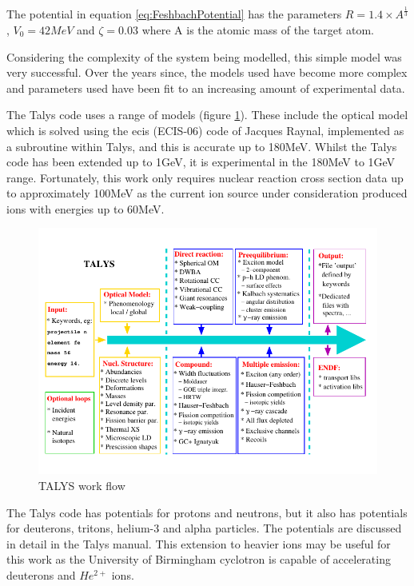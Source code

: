 The potential in equation \ref{eq:FeshbachPotential} has the parameters $R = 1.4 \times A^{\frac{1}{3}}$, $V_0 = 42MeV$ and $\zeta = 0.03$ where A is the atomic mass of the target atom.

Considering the complexity of the system being modelled, this simple model was very successful.  Over the years since, the models used have become more complex and parameters used have been fit to an increasing amount of experimental data.

The Talys code uses a range of models (figure \ref{fig:talysworkflow}).  These include the optical model which is solved using the \acrlong{ecis} (ECIS-06) code of Jacques Raynal, implemented as a subroutine within Talys, and this is accurate up to 180MeV\cite{talysmanual}.  Whilst the Talys code has been extended up to 1GeV, it is experimental in the 180MeV to 1GeV range.  Fortunately, this work only requires nuclear reaction cross section data up to approximately 100MeV as the current ion source under consideration produced ions with energies up to 60MeV.

\begin{figure}[tbp]
  \begin{center}
    \includegraphics[width=.6\linewidth]{chapters/background_activity/images/talys.png}
    \caption{TALYS work flow \cite{talysmanual}}
    \label{fig:talysworkflow}
  \end{center}
\end{figure}

The Talys code has potentials for protons and neutrons, but it also has potentials for deuterons, tritons, helium-3 and alpha particles.  The potentials are discussed in detail in the Talys manual\cite{talysmanual}.  This extension to heavier ions may be useful for this work as the University of Birmingham cyclotron is capable of accelerating deuterons and $He^{2+}$ ions.

